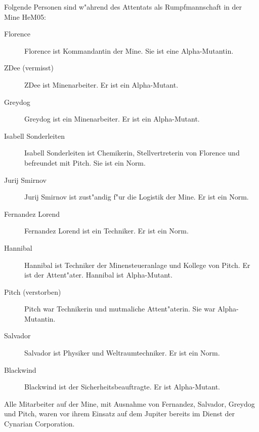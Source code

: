 
Folgende Personen sind w"ahrend des Attentats als Rumpfmannschaft in der Mine HeM05:

\begin{description}
    \item[Florence] Florence ist Kommandantin der Mine. Sie ist eine Alpha-Mutantin.
    \item[ZDee (vermisst)] ZDee ist Minenarbeiter. Er ist ein Alpha-Mutant.
    \item[Greydog] Greydog ist ein Minenarbeiter. Er ist ein Alpha-Mutant.
    \item[Isabell Sonderleiten] Isabell Sonderleiten ist Chemikerin, Stellvertreterin von Florence und befreundet mit Pitch. Sie ist ein 
        Norm.
    \item[Jurij Smirnov] Jurij Smirnov ist zust"andig f"ur die Logistik der Mine. Er ist ein Norm.
    \item[Fernandez Lorend] Fernandez Lorend ist ein Techniker. Er ist ein Norm.
    \item[Hannibal] Hannibal ist Techniker der Minensteueranlage und Kollege von Pitch. Er ist der Attent"ater. Hannibal ist 
        Alpha-Mutant.
    \item[Pitch (verstorben)] Pitch war Technikerin und mutma\3liche Attent"aterin. Sie war Alpha-Mutantin.
    \item[Salvador] Salvador ist Physiker und Weltraumtechniker. Er ist ein Norm.
    \item[Blackwind] Blackwind ist der Sicherheitsbeauftragte. Er ist Alpha-Mutant.
\end{description}

Alle Mitarbeiter auf der Mine, mit Ausnahme von Fernandez, Salvador, Greydog und Pitch, waren vor ihrem Einsatz auf dem Jupiter bereits im Dienst der Cynarian Corporation.

